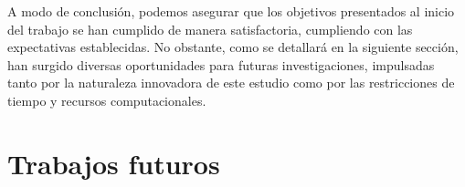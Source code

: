 A modo de conclusión, podemos asegurar que los objetivos presentados al inicio del trabajo se han cumplido de manera satisfactoria, cumpliendo con las expectativas establecidas. No obstante, como se detallará en la siguiente sección, han surgido diversas oportunidades para futuras investigaciones, impulsadas tanto por la naturaleza innovadora de este estudio como por las restricciones de tiempo y recursos computacionales.

\chapter{Trabajos futuros}\label{ch:trabajos-futuros}



\endinput
